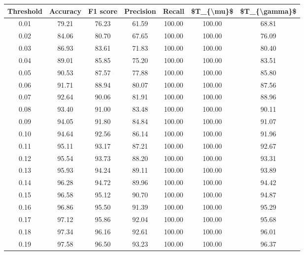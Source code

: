 \begin{tabular}{|c|c|c|c|c|c|c|}
\hline
 Threshold &  Accuracy &  F1 score &  Precision &  Recall &  \$T\_\{\textbackslash mu\}\$ &  \$T\_\{\textbackslash gamma\}\$ \\
\hline
      0.01 &     79.21 &     76.23 &      61.59 &  100.00 &     100.00 &         68.81 \\
      0.02 &     84.06 &     80.70 &      67.65 &  100.00 &     100.00 &         76.09 \\
      0.03 &     86.93 &     83.61 &      71.83 &  100.00 &     100.00 &         80.40 \\
      0.04 &     89.01 &     85.85 &      75.20 &  100.00 &     100.00 &         83.51 \\
      0.05 &     90.53 &     87.57 &      77.88 &  100.00 &     100.00 &         85.80 \\
      0.06 &     91.71 &     88.94 &      80.07 &  100.00 &     100.00 &         87.56 \\
      0.07 &     92.64 &     90.06 &      81.91 &  100.00 &     100.00 &         88.96 \\
      0.08 &     93.40 &     91.00 &      83.48 &  100.00 &     100.00 &         90.11 \\
      0.09 &     94.05 &     91.80 &      84.84 &  100.00 &     100.00 &         91.07 \\
      0.10 &     94.64 &     92.56 &      86.14 &  100.00 &     100.00 &         91.96 \\
      0.11 &     95.11 &     93.17 &      87.21 &  100.00 &     100.00 &         92.67 \\
      0.12 &     95.54 &     93.73 &      88.20 &  100.00 &     100.00 &         93.31 \\
      0.13 &     95.93 &     94.24 &      89.11 &  100.00 &     100.00 &         93.89 \\
      0.14 &     96.28 &     94.72 &      89.96 &  100.00 &     100.00 &         94.42 \\
      0.15 &     96.58 &     95.12 &      90.70 &  100.00 &     100.00 &         94.87 \\
      0.16 &     96.86 &     95.50 &      91.39 &  100.00 &     100.00 &         95.29 \\
      0.17 &     97.12 &     95.86 &      92.04 &  100.00 &     100.00 &         95.68 \\
      0.18 &     97.34 &     96.16 &      92.61 &  100.00 &     100.00 &         96.01 \\
      0.19 &     97.58 &     96.50 &      93.23 &  100.00 &     100.00 &         96.37 \\

\end{tabular}
